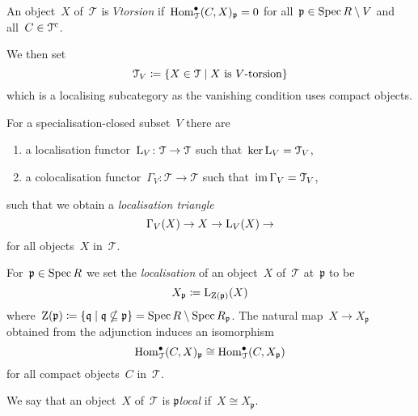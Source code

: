 \documentclass[10pt,a4paper]{article}
\begin{document}
\begin{definition}
  An object~$X$ of~$\mathcal{T}$ is \emph{$V$\dash torsion} if~$\operatorname{Hom}_{\mathcal{T}}^\bullet(C,X)_{\mathfrak{p}}=0$ for all~$\mathfrak{p}\in\operatorname{Spec} R\setminus V$ and all~$C\in\mathcal{T}^{\mathrm{c}}$.

  We then set
  \begin{equation}
    \mathcal{T}_V\coloneqq\left\{ X\in\mathcal{T}\mid\text{$X$ is $V$\dash torsion} \right\}
  \end{equation}
  which is a localising subcategory as the vanishing condition uses compact objects.
\end{definition}

\begin{proposition}
  For a specialisation-closed subset~$V$ there are
  \begin{enumerate}
    \item a localisation functor~$\operatorname{L}_V\colon\mathcal{T}\to\mathcal{T}$ such that~$\ker\operatorname{L}_V=\mathcal{T}_V$,
    \item a colocalisation functor~$\Gamma_V\colon\mathcal{T}\to\mathcal{T}$ such that~$\operatorname{im}\Gamma_V=\mathcal{T}_V$,
  \end{enumerate}
  such that we obtain a \emph{localisation triangle}
  \begin{equation}
    \Gamma_V(X)\to X\to\operatorname{L}_V(X)\to
  \end{equation}
  for all objects~$X$ in~$\mathcal{T}$.
\end{proposition}

For~$\mathfrak{p}\in\operatorname{Spec} R$ we set the \emph{localisation} of an object~$X$ of~$\mathcal{T}$ at~$\mathfrak{p}$ to be
\begin{equation}
  X_{\mathfrak{p}}\coloneqq\operatorname{L}_{\operatorname{Z}(\mathfrak{p})}(X)
\end{equation}
where~$\operatorname{Z}(\mathfrak{p})\coloneqq\{\mathfrak{q}\mid\mathfrak{q}\nsubseteq\mathfrak{p}\}=\operatorname{Spec} R\setminus\operatorname{Spec} R_{\mathfrak{p}}$. The natural map~$X\to X_{\mathfrak{p}}$ obtained from the adjunction induces an isomorphism
\begin{equation}
  \operatorname{Hom}_{\mathcal{T}}^\bullet(C,X)_{\mathfrak{p}}\cong\operatorname{Hom}_{\mathcal{T}}^\bullet(C,X_{\mathfrak{p}})
\end{equation}
for all compact objects~$C$ in~$\mathcal{T}$.

\begin{definition}
  We say that an object~$X$ of~$\mathcal{T}$ is \emph{$\mathfrak{p}$\dash local} if~$X\cong X_{\mathfrak{p}}$.
\end{definition}
\end{document}
